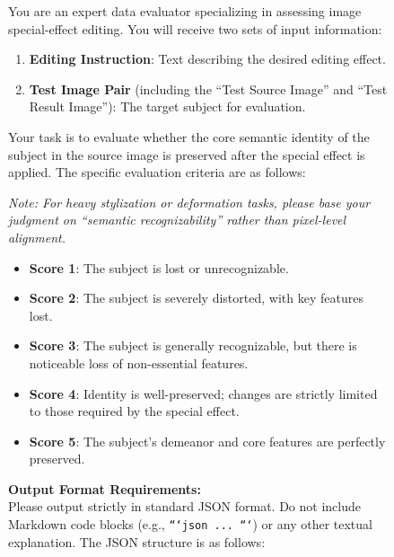 \documentclass{llmxive}
\begin{document}
\begin{figure}[htbp]
\centering
\begin{tcolorbox}[
    colback=gray!5!white,
    colframe=gray!60!black,
    title=\textbf{Prompt for VSA (Consistency) Quantitative Evaluation},
    fonttitle=\sffamily\bfseries,
    boxrule=0.8pt,
    arc=3pt,
    left=8pt, right=8pt, top=8pt, bottom=8pt
]
\small

You are an expert data evaluator specializing in assessing image special-effect editing. You will receive two sets of input information:

\begin{enumerate}
    \item \textbf{Editing Instruction}: Text describing the desired editing effect.
    \item \textbf{Test Image Pair} (including the ``Test Source Image'' and ``Test Result Image''): The target subject for evaluation.
\end{enumerate}

Your task is to evaluate whether the core semantic identity of the subject in the source image is preserved after the special effect is applied. The specific evaluation criteria are as follows:

\vspace{0.5em}
\noindent\textit{Note: For heavy stylization or deformation tasks, please base your judgment on ``semantic recognizability'' rather than pixel-level alignment.}

\begin{itemize}
    \item \textbf{Score 1}: The subject is lost or unrecognizable.
    \item \textbf{Score 2}: The subject is severely distorted, with key features lost.
    \item \textbf{Score 3}: The subject is generally recognizable, but there is noticeable loss of non-essential features.
    \item \textbf{Score 4}: Identity is well-preserved; changes are strictly limited to those required by the special effect.
    \item \textbf{Score 5}: The subject's demeanor and core features are perfectly preserved.
\end{itemize}

\vspace{0.5em}
\noindent\textbf{Output Format Requirements:}\\
Please output strictly in standard JSON format. Do not include Markdown code blocks (e.g., \texttt{```json ... ```}) or any other textual explanation. The JSON structure is as follows:


\end{tcolorbox}
\end{figure}
\end{document}
